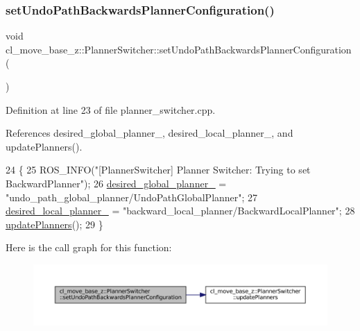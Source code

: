 \subsubsection{\texorpdfstring{set\+Undo\+Path\+Backwards\+Planner\+Configuration()}{setUndoPathBackwardsPlannerConfiguration()}}
{\footnotesize\ttfamily void cl\+\_\+move\+\_\+base\+\_\+z\+::\+Planner\+Switcher\+::set\+Undo\+Path\+Backwards\+Planner\+Configuration (\begin{DoxyParamCaption}{ }\end{DoxyParamCaption})}



Definition at line 23 of file planner\+\_\+switcher.\+cpp.



References desired\+\_\+global\+\_\+planner\+\_\+, desired\+\_\+local\+\_\+planner\+\_\+, and update\+Planners().


\begin{DoxyCode}
24 \{
25   ROS\_INFO(\textcolor{stringliteral}{"[PlannerSwitcher] Planner Switcher: Trying to set BackwardPlanner"});
26   \hyperlink{classcl__move__base__z_1_1PlannerSwitcher_aef047d3778b2993c1df146bbad43e03d}{desired\_global\_planner\_} = \textcolor{stringliteral}{"undo\_path\_global\_planner/UndoPathGlobalPlanner"};
27   \hyperlink{classcl__move__base__z_1_1PlannerSwitcher_a6cbf65f11bb69125f913caaabdf7b4cf}{desired\_local\_planner\_} = \textcolor{stringliteral}{"backward\_local\_planner/BackwardLocalPlanner"};
28   \hyperlink{classcl__move__base__z_1_1PlannerSwitcher_a146641f63aea3185daab4c5cbb789550}{updatePlanners}();
29 \}
\end{DoxyCode}
Here is the call graph for this function\+:
\nopagebreak
\begin{figure}[H]
\begin{center}
\leavevmode
\includegraphics[width=350pt]{classcl__move__base__z_1_1PlannerSwitcher_a99e5ec5c0529dab7b528c1e0d9e36012_cgraph}
\end{center}
\end{figure}
\mbox{\label{classcl__move__base__z_1_1PlannerSwitcher_a560f77f78b527ed9a0d4f598d98713a3}} 
